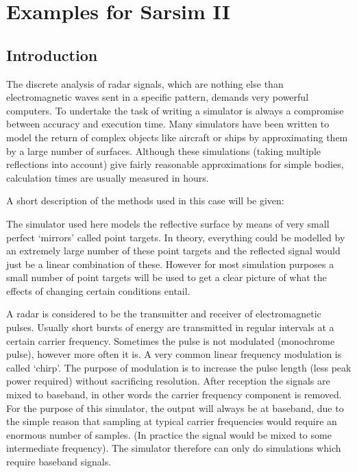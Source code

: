                      

\chapter{Examples for Sarsim II\label{app:examples}}

\section{Introduction}

The discrete analysis of radar signals, which are nothing else than
electromagnetic waves sent in a specific pattern, demands very powerful
computers. To undertake the task of writing a simulator is always a
compromise between accuracy and execution time. Many simulators have been
written to model the return of complex objects like aircraft or ships by
approximating them by a large number of surfaces. Although these simulations
(taking multiple reflections into account) give fairly reasonable
approximations for simple bodies, calculation times are usually measured in
hours.

A short description of the methods used in this case will be given:

The simulator used here models the reflective surface by means of very small
perfect `mirrors' called point targets. In theory, everything could be
modelled by an extremely large number of these point targets and the
reflected signal would just be a linear combination of these. However for
most simulation purposes a small number of point targets will be used to get
a clear picture of what the effects of changing certain conditions entail.

A radar is considered to be the transmitter and receiver of electromagnetic
pulses. Usually short bursts of energy are transmitted in regular intervals
at a certain carrier frequency. Sometimes the pulse is not modulated
(monochrome pulse), however more often it is. A very common linear frequency
modulation is called `chirp'. The purpose of modulation is to increase the
pulse length (less peak power required) without sacrificing resolution.
After reception the signals are mixed to baseband, in other words the
carrier frequency component is removed. For the purpose of this simulator,
the output will always be at baseband, due to the simple reason that
sampling at typical carrier frequencies would require an enormous number of
samples. (In practice the signal would be mixed to some intermediate
frequency). The simulator therefore can only do simulations which require
baseband signals.

